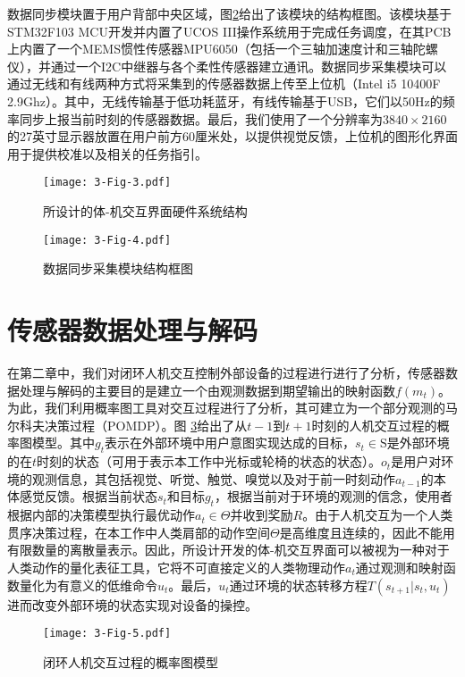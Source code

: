 数据同步模块置于用户背部中央区域，图\ref{3-fig-4}给出了该模块的结构框图。该模块基于STM32F103 MCU开发并内置了UCOS III操作系统用于完成任务调度，在其PCB上内置了一个MEMS惯性传感器MPU6050（包括一个三轴加速度计和三轴陀螺仪），并通过一个I2C中继器与各个柔性传感器建立通讯。数据同步采集模块可以通过无线和有线两种方式将采集到的传感器数据上传至上位机（Intel i5 10400F 2.9Ghz）。其中，无线传输基于低功耗蓝牙，有线传输基于USB，它们以50Hz的频率同步上报当前时刻的传感器数据。最后，我们使用了一个分辨率为$3840\times2160$的27英寸显示器放置在用户前方60厘米处，以提供视觉反馈，上位机的图形化界面用于提供校准以及相关的任务指引。  

\begin{figure}[!t]
    \centering
    \texttt{[image: 3-Fig-3.pdf]}
    \caption{所设计的体-机交互界面硬件系统结构}
    \label{3-fig-3}
\end{figure}     

\begin{figure}[!t]
    \centering
    \texttt{[image: 3-Fig-4.pdf]}
    \caption{数据同步采集模块结构框图}
    \label{3-fig-4}
\end{figure} 

\section{传感器数据处理与解码} 
在第二章中，我们对闭环人机交互控制外部设备的过程进行进行了分析，传感器数据处理与解码的主要目的是建立一个由观测数据到期望输出的映射函数$f(m_t)$。为此，我们利用概率图工具对交互过程进行了分析，其可建立为一个部分观测的马尔科夫决策过程（POMDP）。图
\ref{3-fig-5}给出了从$t-1$到$t+1$时刻的人机交互过程的概率图模型。其中${g_t}$表示在外部环境中用户意图实现达成的目标，${s_t} \in {\text{S}}$是外部环境的在$t$时刻的状态（可用于表示本工作中光标或轮椅的状态的状态）。${o_t}$是用户对环境的观测信息，其包括视觉、听觉、触觉、嗅觉以及对于前一时刻动作${a_{t - 1}}$的本体感觉反馈。根据当前状态${s_t}$和目标${g_t}$，根据当前对于环境的观测的信念，使用者根据内部的决策模型执行最优动作${a_t} \in \Theta $并收到奖励$R$。由于人机交互为一个人类贯序决策过程，在本工作中人类肩部的动作空间$\Theta $是高维度且连续的，因此不能用有限数量的离散量表示。因此，所设计开发的体-机交互界面可以被视为一种对于人类动作的量化表征工具，它将不可直接定义的人类物理动作${a_t}$通过观测和映射函数量化为有意义的低维命令${u_t}$。最后，${u_t}$通过环境的状态转移方程$T({s_{t+1}}|{s_{t}},{u_{t}})$进而改变外部环境的状态实现对设备的操控。

\begin{figure}[!t]
    \centering
    \texttt{[image: 3-Fig-5.pdf]}
    \caption{闭环人机交互过程的概率图模型}
    \label{3-fig-5}
\end{figure} 

